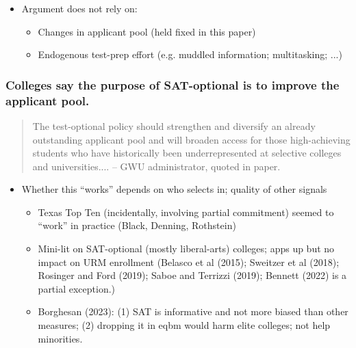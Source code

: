 \documentclass[11pt, aspectratio=169]{beamer}
\theoremstyle{plain}
\theoremstyle{plain}
\theoremstyle{plain}
\theoremstyle{plain}
\begin{document}
\begin{frame}
\begin{itemize}
        \item Argument does not rely on: \pause
        \begin{itemize}
            \item Changes in applicant pool (held fixed in this paper) \pause
            \item Endogenous test-prep effort (e.g. muddled information; multitasking; ...)
        \end{itemize}
    \end{itemize}
\end{frame}

\begin{frame}\frametitle{Colleges say the purpose of SAT-optional is to improve the applicant pool.}
    \begin{quotation} The test-optional policy should strengthen and diversify an already outstanding applicant pool and will broaden access for those high-achieving students who have historically been underrepresented at selective colleges and universities....
        -- GWU administrator, quoted in paper. \end{quotation} \pause
    \begin{itemize}
        \item Whether this ``works'' depends on who selects in; quality of other signals \pause
        \begin{itemize}   %
            \item Texas Top Ten (incidentally, involving partial commitment) seemed to ``work'' in practice (Black, Denning, Rothstein) \pause
            \item Mini-lit on SAT-optional (mostly liberal-arts) colleges; apps up but no impact on URM enrollment (Belasco et al (2015); Sweitzer et al (2018); Rosinger and Ford (2019); Saboe and Terrizzi (2019); Bennett (2022) is a partial exception.) \pause
            \item Borghesan (2023): (1) SAT is informative and not more biased than other measures; (2) dropping it in eqbm would harm elite colleges; not help minorities.
        \end{itemize}
    \end{itemize}
\end{frame}
\end{document}
